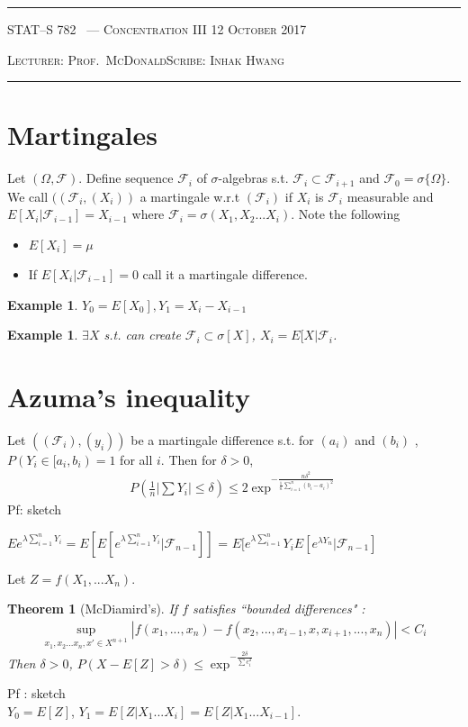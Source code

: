 \documentclass[10pt]{article}
\newcounter{lecnum}
\newtheorem{theorem}{Theorem}[lecnum]
\newtheorem{example}[ex]{Example}
\newcommand{\lecturer}{Prof.\ McDonald}
\newcommand{\scribe}{Inhak Hwang}
\newcommand{\chtitle}{Concentration III}
\newcommand{\lecdate}{12 October 2017}
\begin{document}
\rule{6.5in}{1pt}

\textsc{STAT--S 782
        \hfill \thelecnum\ --- \chtitle
        \hfill \lecdate}

\textsc{Lecturer: \lecturer \hfill Scribe: \scribe}
\rule{6.5in}{1pt}

\section{Martingales}
Let $(\Omega, \mathscr{F})$. Define sequence $\mathscr{F}_{i}$ of $\sigma$-algebras s.t. $\mathscr{F}_{i} \subset \mathscr{F}_{i+1}$ and $\mathscr{F}_{0} = \sigma\{ \Omega\}$. We call $((\mathscr{F}_{i}, (X_{i}))$ a martingale w.r.t $(\mathscr{F}_{i})$ if $X_{i}$ is $\mathscr{F}_{i}$ measurable and $E[X_{i} | \mathscr{F}_{i-1}] = X_{i-1}$ where $\mathscr{F}_{i} = \sigma(X_{1},X_{2}...X_{i})$. Note the following 
\begin{itemize}
\item $ E[X_{i}] = \mu $
\item If $E[X_{i}|\mathscr{F}_{i-1}] = 0$ call it a martingale difference.
\end{itemize}

\begin{example}
$Y_{0} = E[X_{0}], Y_{1} = X_{i} - X_{i-1}$
\end{example}
\begin{example}
$\exists X$ s.t. can create $\mathscr{F}_{i} \subset \sigma[X]$, $X_{i} = E[X | \mathscr{F}_{i}$.
\end{example}

\section{Azuma's inequality}
Let $((\mathscr{F}_{i}), (y_{i}))$ be a martingale difference s.t. for $(a_{i})$ and $(b_{i})$ , $P(Y_{i} \in [a_{i}, b_{i}) = 1 $ for all $i$. Then for $\delta > 0$, 
\begin{align*}
P(\frac{1}{n}|\sum Y_{i}| \le \delta) \le 2\exp^{-\frac{n\delta^{2}}{\frac{1}{n}\sum\limits_{i=1}^{n}(b_{i}-a_{i})^{2}  }}
\end{align*}
Pf: sketch \par
$Ee^{\lambda \sum\limits_{i=1}^{n}Y_{i}} = E[E[e^{\lambda\sum\limits_{i=1}^{n}Y_{i}}|\mathscr{F}_{n-1}]] $
= $ E[e^{\lambda \sum\limits_{i=1}^{n}} Y_{i}E[e^{ \lambda Y_{n} } | \mathscr{F}_{n-1}] $ \\
\par
Let $Z = f(X_{1},...X_{n})$.
\begin{theorem}[McDiamird's]
If $f$ satisfies ``bounded differences" : \\
\begin{align*}
\sup\limits_{x_{1},x_{2}...x_{n},x'\in X^{n+1}}|f(x_{1},...,x_{n}) - f(x_{2},..., x_{i-1},x, x_{i+1},...,x_{n})| < C_{i}
\end{align*}
Then $\delta > 0$, $P(X - E[Z] > \delta) \le \exp^{-\frac{2\delta}{\sum c_{i}^{2}}}$
\end{theorem}
Pf : sketch \\
$Y_{0} = E[Z]$, $Y_{1} = E[Z|X_{1}...X_{i}] = E[Z|X_{1}...X_{i-1}]$.


\end{document}
